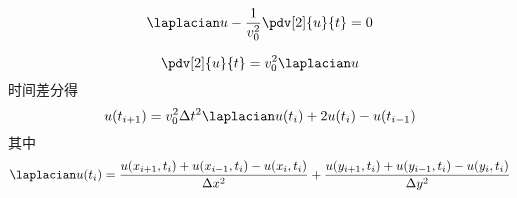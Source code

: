 
\begin{equation}
\laplacian u - \frac{1}{v_0^2}\pdv[2]{u}{t} = 0
\end{equation}

\begin{equation}
\pdv[2]{u}{t} = v_0^2\laplacian u
\end{equation}
时间差分得
\begin{equation}
u(t_{i+1}) = v_0^2\Delta t^2\laplacian u(t_i) + 2u(t_{i}) - u(t_{i-1})
\end{equation}
其中
\begin{equation}
\laplacian u(t_i) = \frac{u(x_{i+1}, t_i) + u(x_{i-1}, t_i) - u(x_{i}, t_i)}{\Delta x^2}
+ \frac{u(y_{i+1}, t_i) + u(y_{i-1}, t_i) - u(y_{i}, t_i)}{\Delta y^2}
\end{equation}
